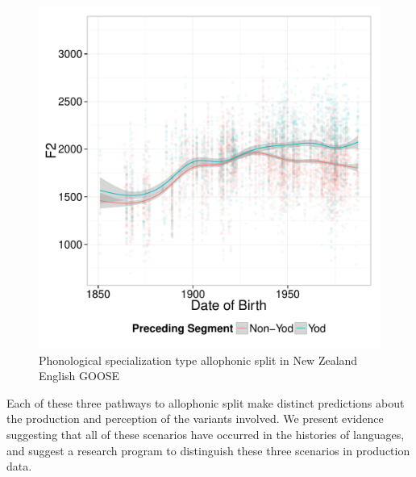 \documentclass[a4paper,aps,prl,12pt,tightenlines,superscriptaddress]{revtex4}
\begin{document}
\begin{figure}
\begin{center}
\includegraphics[width=.7\textwidth]{ByTokenOldPreceding.pdf}
\end{center}
\caption{Phonological specialization type allophonic split in New Zealand English GOOSE}
\label{newzeaFig}
\end{figure}


Each of these three pathways to allophonic split make distinct predictions about the production and perception of the variants involved. We present evidence suggesting that all of these scenarios have occurred in the histories of languages, and suggest a research program to distinguish these three scenarios in production data. 


 

\end{document}
